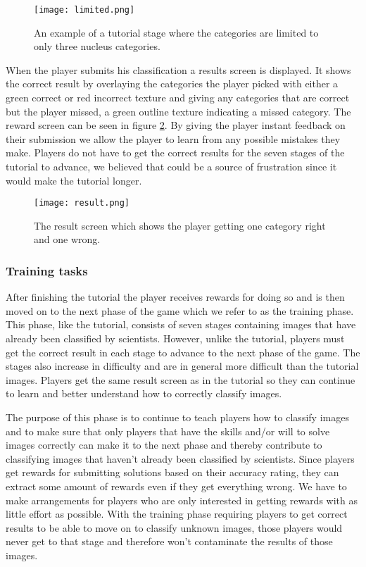 		\begin{figure}[H]
		  \centering
		  \graphicspath{ {./graphics/} }
		  \centerline{\texttt{[image: limited.png]}}
		  \caption{\label{fig:limited}An example of a tutorial stage where the categories are limited to only three nucleus categories.}
		\end{figure}

		When the player submits his classification a results screen is displayed. It shows the correct result by overlaying the categories the player picked with either a green correct or red incorrect texture and giving any categories that are correct but the player missed, a green outline texture indicating a missed category. The reward screen can be seen in figure \ref{fig:result}. By giving the player instant feedback on their submission we allow the player to learn from any possible mistakes they make. Players do not have to get the correct results for the seven stages of the tutorial to advance, we believed that could be a source of frustration since it would make the tutorial longer. 

		\begin{figure}[H]
		  \centering
		  \graphicspath{ {./graphics/} }
		  \centerline{\texttt{[image: result.png]}}
		  \caption{\label{fig:result}The result screen which shows the player getting one category right and one wrong.}
		\end{figure}

	\subsubsection{Training tasks}
		After finishing the tutorial the player receives rewards for doing so and is then moved on to the next phase of the game which we refer to as the training phase. This phase, like the tutorial, consists of seven stages containing images that have already been classified by scientists. However, unlike the tutorial, players must get the correct result in each stage to advance to the next phase of the game. The stages also increase in difficulty and are in general more difficult than the tutorial images. Players get the same result screen as in the tutorial so they can continue to learn and better understand how to correctly classify images. 

		The purpose of this phase is to continue to teach players how to classify images and to make sure that only players that have the skills and/or will to solve images correctly can make it to the next phase and thereby contribute to classifying images that haven't already been classified by scientists. Since players get rewards for submitting solutions based on their accuracy rating, they can extract some amount of rewards even if they get everything wrong. We have to make arrangements for players who are only interested in getting rewards with as little effort as possible. With the training phase requiring players to get correct results to be able to move on to classify unknown images, those players would never get to that stage and therefore won't contaminate the results of those images.


